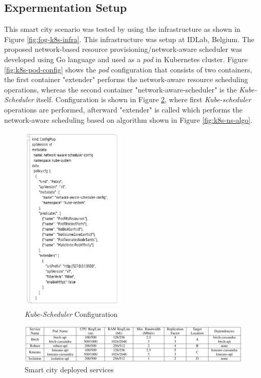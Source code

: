   \subsection{Expermentation Setup}
  \label{sec:setup}
  This smart city scenario was tested by using the infrastructure as shown in Figure \ref{fig:fog-k8s-infra}. This infrastructure was setup at IDLab, Belgium\cite{Santos2019}. The proposed network-based resource provisioning/network-aware scheduler was developed using Go language and used as a \emph{pod} in Kubernetes cluster\cite{Santos2019}. Figure \ref{fig:k8s-pod-config} shows the \emph{pod} configuration that consists of two containers, the first container "extender" performs the network-aware resource scheduling operations, whereas the second container "network-aware-scheduler" is the \emph{Kube-Scheduler} itself\cite{Santos2019}. Configuration is shown in Figure \ref{fig:k8s-sch-config}, where first \emph{Kube-scheduler} operations are performed, afterward "extender" is called which performs the network-aware scheduling based on algorithm\cite{Santos2019} shown in Figure \ref{fig:k8s-ns-algo}. \par
  \begin{figure}
    \centering
    \includegraphics[width=\linewidth, height=9cm]{figures/mlcn-k8s-scheduler-config.pdf}
    \caption{\emph{Kube-Scheduler} Configuration\cite{Santos2019}}
    \label{fig:k8s-sch-config}
  \end{figure}
  \begin{figure}
    \includegraphics[width=\linewidth]{figures/mlcn-k8s-service-pods.pdf}
    \caption{Smart city deployed services\cite{Santos2019}}
    \label{fig:k8s-sch-config}
  \end{figure}
